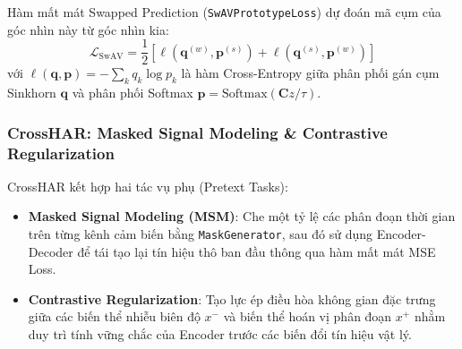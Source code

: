Hàm mất mát Swapped Prediction (\texttt{SwAVPrototypeLoss}) dự đoán mã cụm của góc nhìn này từ góc nhìn kia:
\begin{equation}
    \mathcal{L}_{\text{SwAV}} = \frac{1}{2} \left[ \ell(\mathbf{q}^{(w)}, \mathbf{p}^{(s)}) + \ell(\mathbf{q}^{(s)}, \mathbf{p}^{(w)}) \right]
\end{equation}
với $\ell(\mathbf{q}, \mathbf{p}) = -\sum_{k} q_k \log p_k$ là hàm Cross-Entropy giữa phân phối gán cụm Sinkhorn $\mathbf{q}$ và phân phối Softmax $\mathbf{p} = \text{Softmax}(\mathbf{C} z / \tau)$.

\subsubsection{CrossHAR: Masked Signal Modeling \& Contrastive Regularization}
CrossHAR kết hợp hai tác vụ phụ (Pretext Tasks):
\begin{itemize}
    \item \textbf{Masked Signal Modeling (MSM)}: Che một tỷ lệ các phân đoạn thời gian trên từng kênh cảm biến bằng \texttt{MaskGenerator}, sau đó sử dụng Encoder-Decoder để tái tạo lại tín hiệu thô ban đầu thông qua hàm mất mát MSE Loss.
    \item \textbf{Contrastive Regularization}: Tạo lực ép điều hòa không gian đặc trưng giữa các biến thể nhiễu biên độ $x^{-}$ và biến thể hoán vị phân đoạn $x^{+}$ nhằm duy trì tính vững chắc của Encoder trước các biến đổi tín hiệu vật lý.
\end{itemize}

